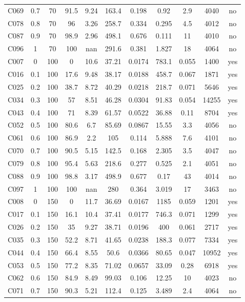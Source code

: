 \begin{longtable}{@{}lcccccccccc@{}}
C069 & 0.7 & 70 & 91.5 & 9.24 & 163.4 & 0.198 & 0.92 & 2.9 & 4040 & no \\
C078 & 0.8 & 70 & 96 & 3.26 & 258.7 & 0.334 & 0.295 & 4.5 & 4012 & no \\
C087 & 0.9 & 70 & 98.9 & 2.96 & 498.1 & 0.676 & 0.111 & 11 & 4010 & no \\
C096 & 1 & 70 & 100 & nan & 291.6 & 0.381 & 1.827 & 18 & 4064 & no \\
C007 & 0 & 100 & 0 & 10.6 & 37.21 & 0.0174 & 783.1 & 0.055 & 1400 & yes \\
C016 & 0.1 & 100 & 17.6 & 9.48 & 38.17 & 0.0188 & 458.7 & 0.067 & 1871 & yes \\
C025 & 0.2 & 100 & 38.7 & 8.72 & 40.29 & 0.0218 & 218.7 & 0.071 & 5646 & yes \\
C034 & 0.3 & 100 & 57 & 8.51 & 46.28 & 0.0304 & 91.83 & 0.054 & 14255 & yes \\
C043 & 0.4 & 100 & 71 & 8.39 & 61.57 & 0.0522 & 36.88 & 0.11 & 8704 & yes \\
C052 & 0.5 & 100 & 80.6 & 6.7 & 85.69 & 0.0867 & 15.55 & 3.3 & 4056 & no \\
C061 & 0.6 & 100 & 86.9 & 2.2 & 105 & 0.114 & 5.888 & 7.6 & 4101 & no \\
C070 & 0.7 & 100 & 90.5 & 5.15 & 142.5 & 0.168 & 2.305 & 3.5 & 4047 & no \\
C079 & 0.8 & 100 & 95.4 & 5.63 & 218.6 & 0.277 & 0.525 & 2.1 & 4051 & no \\
C088 & 0.9 & 100 & 98.8 & 3.17 & 498.9 & 0.677 & 0.17 & 43 & 4014 & no \\
C097 & 1 & 100 & 100 & nan & 280 & 0.364 & 3.019 & 17 & 3463 & no \\
C008 & 0 & 150 & 0 & 11.7 & 36.69 & 0.0167 & 1185 & 0.059 & 1201 & yes \\
C017 & 0.1 & 150 & 16.1 & 10.4 & 37.41 & 0.0177 & 746.3 & 0.071 & 1299 & yes \\
C026 & 0.2 & 150 & 35 & 9.27 & 38.71 & 0.0196 & 400 & 0.061 & 2717 & yes \\
C035 & 0.3 & 150 & 52.2 & 8.71 & 41.65 & 0.0238 & 188.3 & 0.077 & 7334 & yes \\
C044 & 0.4 & 150 & 66.4 & 8.55 & 50.6 & 0.0366 & 80.65 & 0.047 & 10952 & yes \\
C053 & 0.5 & 150 & 77.2 & 8.35 & 71.02 & 0.0657 & 33.09 & 0.28 & 6918 & yes \\
C062 & 0.6 & 150 & 84.9 & 8.49 & 99.03 & 0.106 & 12.25 & 10 & 4023 & no \\
C071 & 0.7 & 150 & 90.3 & 5.21 & 112.4 & 0.125 & 3.489 & 2.4 & 4064 & no \\

\end{longtable}

